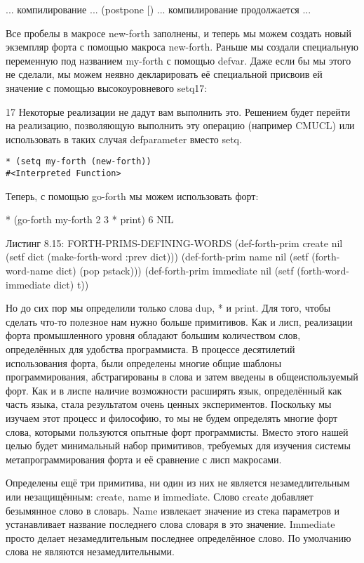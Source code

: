 ... компилирование ...
(postpone [)
... компилирование продолжается ...

Все пробелы в макросе new-forth заполнены, и теперь мы можем создать новый экземпляр форта с помощью макроса new-forth. Раньше мы создали специальную переменную под названием my-forth с помощью defvar. Даже если бы мы этого не сделали, мы можем неявно декларировать её специальной присвоив ей значение с помощью высокоуровневого setq17:

17 Некоторые реализации не дадут вам выполнить это. Решением будет перейти на реализацию, позволяющую выполнить эту операцию (например CMUCL) или использовать в таких случая defparameter вместо setq.

\begin{verbatim}
* (setq my-forth (new-forth))
#<Interpreted Function>
\end{verbatim}

Теперь, с помощью go-forth мы можем использовать форт:

* (go-forth my-forth
2 3 * print)
6
NIL

Листинг 8.15: FORTH-PRIMS-DEFINING-WORDS
(def-forth-prim create nil
(setf dict (make-forth-word :prev dict)))
(def-forth-prim name nil
(setf (forth-word-name dict) (pop pstack)))
(def-forth-prim immediate nil
(setf (forth-word-immediate dict) t))

Но до сих пор мы определили только слова dup, * и print. Для того, чтобы сделать что-то полезное нам нужно больше примитивов. Как и лисп, реализации форта промышленного уровня обладают большим количеством слов, определённых для удобства программиста. В процессе десятилетий использования форта, были определены многие общие шаблоны программирования, абстрагированы в слова и затем введены в общеиспользуемый форт. Как и в лиспе наличие возможности расширять язык, определённый как часть языка, стала результатом очень ценных экспериментов. Поскольку мы изучаем этот процесс и философию, то мы не будем определять многие форт слова, которыми пользуются опытные форт программисты. Вместо этого нашей целью будет минимальный набор примитивов, требуемых для изучения системы метапрограммирования форта и её сравнение с лисп макросами.

Определены ещё три примитива, ни один из них не является незамедлительным или незащищённым: create, name и immediate. Слово create добавляет безымянное слово в словарь. Name извлекает значение из стека параметров и устанавливает название последнего слова словаря в это значение. Immediate просто делает незамедлительным последнее определённое слово. По умолчанию слова не являются незамедлительными.

